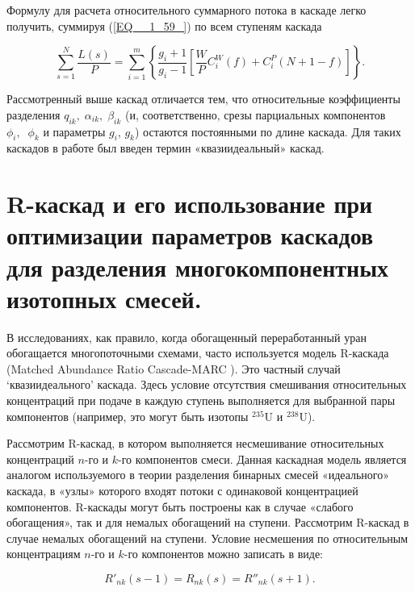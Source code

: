 Формулу для расчета относительного суммарного потока в каскаде легко получить, суммируя (\ref{EQ__1_59_}) по всем ступеням каскада

\begin{equation} \label{EQ__1_62_} 
  \sum _{s=1}^{N}\frac{L(s)}{P} =\sum _{i=1}^{m}\left\{\frac{g_{i} +1}{g_{i} -1} \left[\frac{W}{P} C_{i}^{W} (f)+C_{i}^{P} \left(N+1-f\right)\right]\right\}  .   
\end{equation} 
  
Рассмотренный выше каскад отличается тем, что относительные коэффициенты разделения $q_{ik} ,\; \alpha _{ik} ,\; \beta _{ik} $ (и, соответственно, срезы парциальных компонентов $\phi _{i} ,\; \; \phi _{k} $ и параметры $g_{i} $, $g_{k} $) остаются постоянными по длине каскада. Для таких каскадов в работе \cite{sazykinKvaziidealnyeKaskadyDlya2000} был введен термин «квазиидеальный» каскад.

\section{R-каскад и его использование при оптимизации параметров каскадов для разделения многокомпонентных изотопных смесей.}

В исследованиях, как правило, когда обогащенный переработанный уран обогащается многопоточными схемами, часто используется модель R-каскада (Matched Abundance Ratio Cascade-MARC \cite{kazukihidaSimultaneousEvaluationEffects1986, delagarzaMulticomponentIsotopeSeparation1961, woodEffectsSeparationProcesses2008}).
Это частный случай `квазиидеального' каскада. Здесь условие отсутствия смешивания относительных концентраций при подаче в каждую ступень выполняется для выбранной пары компонентов (например, это могут быть изотопы $^{235}$U и $^{238}$U).

Рассмотрим R-каскад, в котором выполняется несмешивание относительных концентраций $n$-го и $k$-го компонентов смеси. Данная каскадная модель является аналогом используемого в теории разделения бинарных смесей «идеального» каскада, в «узлы» которого входят потоки с одинаковой концентрацией компонентов. R-каскады могут быть построены как в случае «слабого обогащения», так и для немалых обогащений на ступени. Рассмотрим R-каскад в случае немалых обогащений на ступени. Условие несмешения по относительным концентрациям $n$-го и $k$-го компонентов можно записать в виде:

\begin{equation} \label{EQ__1_68_} 
  R'_{nk} (s-1)=R_{nk} (s)=R''_{nk} (s+1).                                                 
\end{equation} 

